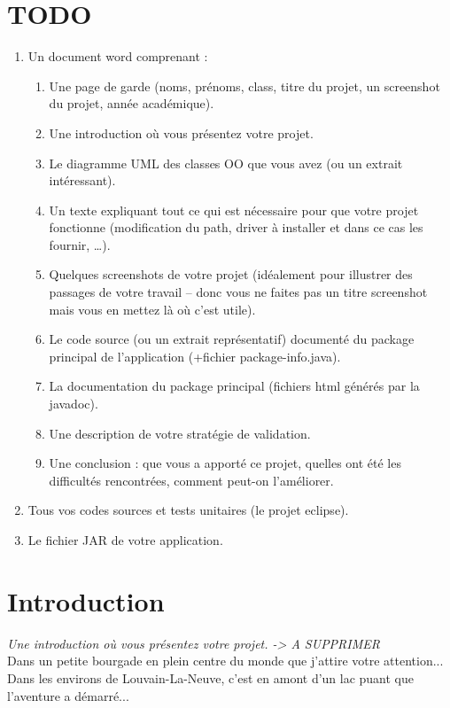 \documentclass[a4paper,titlepage]{article}
\begin{document}
	\section*{TODO}
	\begin{enumerate}
		\item Un document word comprenant : 
		\begin{enumerate}
			\item Une page de garde (noms, prénoms, class, titre du projet, un screenshot du projet, année académique).
			\item Une introduction où vous présentez votre projet.
			\item Le diagramme UML des classes OO que vous avez (ou un extrait intéressant).
			\item Un texte expliquant tout ce qui est nécessaire pour que votre projet fonctionne (modification du path, driver à installer et dans ce cas les fournir, …).
			\item Quelques screenshots de votre projet (idéalement pour illustrer des passages de votre travail – donc vous ne faites pas un titre screenshot mais vous en mettez là où c’est utile).
			\item Le code source (ou un extrait représentatif) documenté du package principal de l’application (+fichier package-info.java).
			\item La documentation du package principal (fichiers html générés par la javadoc).
			\item Une description de votre stratégie de validation.
			\item Une conclusion : que vous a apporté ce projet, quelles ont été les difficultés rencontrées, comment peut-on l’améliorer.
		\end{enumerate}
		\item Tous vos codes sources et tests unitaires (le projet eclipse).
		\item Le fichier JAR de votre application.
	\end{enumerate}
	\clearpage
	\section{Introduction}
	\textit{Une introduction où vous présentez votre projet. -> A SUPPRIMER}\\
	
	Dans un petite bourgade en plein centre du monde que j'attire votre attention...\\
	Dans les environs de Louvain-La-Neuve, c'est en amont d'un lac puant que l'aventure a démarré...\\
	
\end{document}

